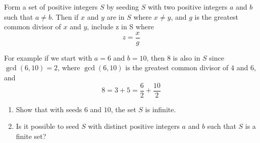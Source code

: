 Form a set of positive integers $S$ by seeding $S$ with two positive integers $a$ and $b$ such that $a \ne b$. Then if $x$ and $y$ are in $S$ where $x \ne y$, and $g$ is the greatest common divisor of $x$ and $y$, include z in S where
$$
z = \frac{x}{g}
$$

For example if we start with $a = 6$ and $b = 10$, then $8$ is also in $S$ since $\gcd(6, 10) = 2$, where $\gcd(6, 10)$ is the greatest common divisor of $4$ and $6$, and
$$
8 = 3 + 5 = \frac{6}{2} + \frac{10}{2}
$$
\begin{enumerate}
\item Show that with seeds $6$ and $10$, the set $S$ is infinite.
\item Is it possible to seed $S$ with distinct positive integers $a$ and $b$ such that $S$ is a finite set?
\end{enumerate}